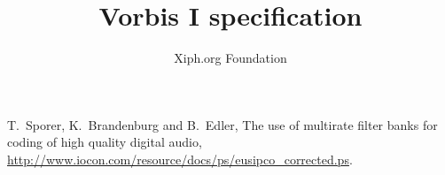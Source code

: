 \documentclass[a4paper]{scrartcl}
\renewcommand{\~}{$\sim$}
\begin{document}
\title{Vorbis I specification}
\author{Xiph.org Foundation}
\maketitle

\tableofcontents












\appendix





 
\begin{thebibliography}{99} 
 
 T.~Sporer, K.~Brandenburg and B.~Edler, 
The use of multirate filter banks for coding of high quality digital audio,
\url{http://www.iocon.com/resource/docs/ps/eusipco_corrected.ps}.


\end{thebibliography}
\end{document}
